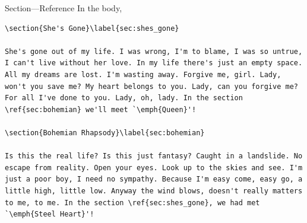 \documentclass[12pt]{gshs_lecture}
\begin{document}
\begin{frame}[t,fragile]{Section---Reference}\small
In the body,
\begin{block}{}
\begin{lstlisting}
\section{She's Gone}\label{sec:shes_gone}

She's gone out of my life. I was wrong, I'm to blame, I was so untrue, I can't live without her love. In my life there's just an empty space. All my dreams are lost. I'm wasting away. Forgive me, girl. Lady, won't you save me? My heart belongs to you. Lady, can you forgive me? For all I've done to you. Lady, oh, lady. In the section \ref{sec:bohemian} we'll meet `\emph{Queen}'!

\section{Bohemian Rhapsody}\label{sec:bohemian}

Is this the real life? Is this just fantasy? Caught in a landslide. No escape from reality. Open your eyes. Look up to the skies and see. I'm just a poor boy, I need no sympathy. Because I'm easy come, easy go, a little high, little low. Anyway the wind blows, doesn't really matters to me, to me. In the section \ref{sec:shes_gone}, we had met `\emph{Steel Heart}'!
\end{lstlisting}
\end{block}
\end{frame}
\end{document}
